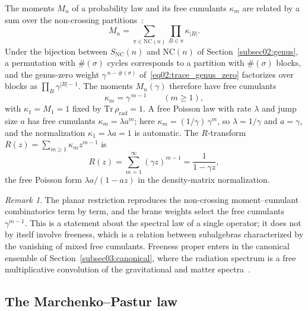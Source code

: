 \documentclass[11pt,letterpaper]{article}
\theoremstyle{plain}
\theoremstyle{definition}
\theoremstyle{remark}
\newtheorem{remark}[theorem]{Remark}
\begin{document}
The moments $M_n$ of a probability law and its free cumulants $\kappa_m$ are related by a sum over the non-crossing partitions~\citep{nicaspeicher2006}:
\begin{equation}
\label{eq03:moment_cumulant}
M_n = \sum_{\pi \in \mathrm{NC}(n)} \prod_{B \in \pi} \kappa_{|B|} .
\end{equation}
Under the bijection between $S_{\mathrm{NC}}(n)$ and $\mathrm{NC}(n)$ of Section~\ref{subsec02:genus}, a permutation with $\#(\sigma)$ cycles corresponds to a partition with $\#(\sigma)$ blocks, and the genus-zero weight $\gamma^{\,n-\#(\sigma)}$ of~\eqref{eq02:trace_genus_zero} factorizes over blocks as $\prod_B \gamma^{|B|-1}$. The moments $M_n(\gamma)$ therefore have free cumulants
\begin{equation}
\kappa_m = \gamma^{\,m-1} \qquad (m\ge 1),
\label{eq03:free_cumulants_scaled}
\end{equation}
with $\kappa_1 = M_1 = 1$ fixed by $\mathrm{Tr}\,\rho_{\mathrm{rad}} = 1$. A free Poisson law with rate $\lambda$ and jump size $a$ has free cumulants $\kappa_m = \lambda a^m$; here $\kappa_m = (1/\gamma)\,\gamma^m$, so $\lambda = 1/\gamma$ and $a = \gamma$, and the normalization $\kappa_1 = \lambda a = 1$ is automatic. The $R$-transform $R(z) = \sum_{m\ge1}\kappa_m z^{m-1}$ is
\begin{equation}
R(z) = \sum_{m=1}^{\infty}(\gamma z)^{m-1} = \frac{1}{1-\gamma z},
\label{eq03:R_transform_scaled}
\end{equation}
the free Poisson form $\lambda a/(1 - a z)$ in the density-matrix normalization.

\begin{remark}
\label{rem03:free_poisson}
The planar restriction reproduces the non-crossing moment--cumulant combinatorics term by term, and the brane weights select the free cumulants $\gamma^{m-1}$. This is a statement about the spectral law of a single operator; it does not by itself involve freeness, which is a relation between subalgebras characterized by the vanishing of mixed free cumulants. Freeness proper enters in the canonical ensemble of Section~\ref{subsec03:canonical}, where the radiation spectrum is a free multiplicative convolution of the gravitational and matter spectra~\citep{wang2023}.
\end{remark}

\subsection{The Marchenko--Pastur law}
\label{subsec03:marchenko_pastur}
\end{document}

